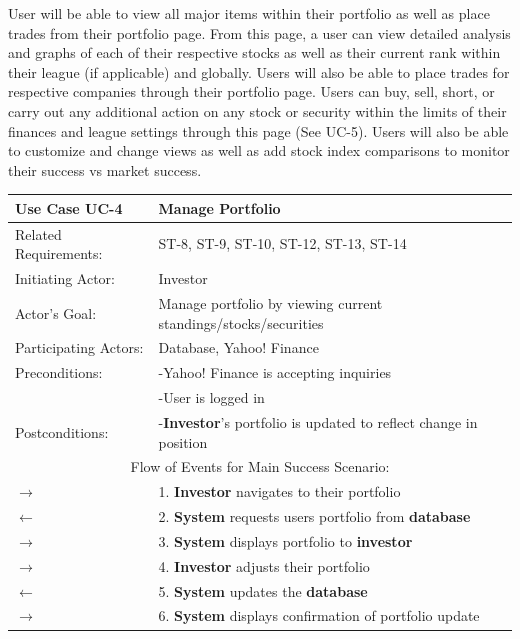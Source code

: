 User will be able to view all major items within their portfolio as well as place trades from
their portfolio page. From this page, a user can view detailed analysis and graphs of each
of their respective stocks as well as their current rank within their league (if applicable)
and globally. Users will also be able to place trades for respective companies through their
portfolio page. Users can buy, sell, short, or carry out any additional action on any stock
or security within the limits of their finances and league settings through this page (See UC-5).
Users will also be able to customize and change views as well as add stock index comparisons
to monitor their success vs market success.\\

\begin{centering}
\label{UC-4}
\renewcommand\arraystretch{1.3}
\begin{longtable}{|p{1.2in} p{5in}|}
\hline
\bfseries{\color{color1}Use Case UC-4} &
\bfseries{\color{color1}Manage Portfolio} \\
\hline
Related Requirements: & ST-8, ST-9, ST-10, ST-12, ST-13, ST-14 \\
Initiating Actor:     & Investor \\
Actor's Goal:         & Manage portfolio by viewing current standings/stocks/securities \\
Participating Actors: & Database, Yahoo! Finance \\
Preconditions:        & -Yahoo! Finance is accepting inquiries \\
                      & -User is logged in \\
Postconditions:       & -\textbf{Investor}'s portfolio is updated to reflect change
                        in position \\
\hline
\multicolumn{2}{|c|}{\color{color1}Flow of Events for Main Success Scenario:}\\
\hline

$\rightarrow$ & 1. \textbf{Investor} navigates to their portfolio \\
 $\leftarrow$ & 2. \textbf{System} requests users portfolio from \textbf{database}\\
$\rightarrow$ & 3. \textbf{System} displays portfolio to \textbf{investor} \\
$\rightarrow$ & 4. \textbf{Investor} adjusts their portfolio \\
 $\leftarrow$ & 5. \textbf{System} updates the \textbf{database} \\
 $\rightarrow$ & 6. \textbf{System} displays confirmation of portfolio update \\
\hline

\end{longtable}
\end{centering}

